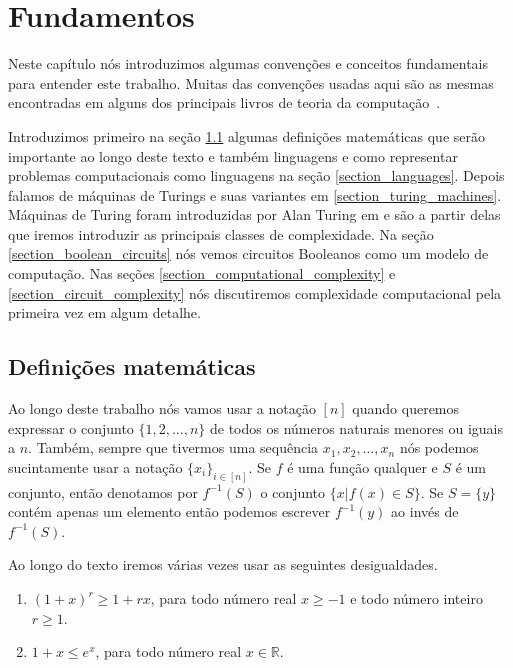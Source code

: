 \chapter{Fundamentos} \label{chapter_fundaments}

Neste capítulo nós introduzimos algumas convenções e conceitos fundamentais para entender este trabalho. Muitas das convenções usadas aqui são as mesmas encontradas em alguns dos principais livros de teoria da computação~\cite{arora2009computational, goldreich2000computational, savage1998models, lewis1997elements, sipser2012introduction}. 

Introduzimos primeiro na seção \ref{section_mathematical_definitions} algumas definições matemáticas que serão importante ao longo deste texto e também linguagens e como representar problemas computacionais como linguagens na seção \ref{section_languages}. Depois falamos de máquinas de Turings e suas variantes em \ref{section_turing_machines}. Máquinas de Turing foram introduzidas por Alan Turing em \cite{turing1936computable} e são a partir delas que iremos introduzir as principais classes de complexidade. Na seção \ref{section_boolean_circuits} nós vemos circuitos Booleanos como um modelo de computação. Nas seções \ref{section_computational_complexity} e \ref{section_circuit_complexity} nós discutiremos complexidade computacional pela primeira vez em algum detalhe.

\section{Definições matemáticas} \label{section_mathematical_definitions}

Ao longo deste trabalho nós vamos usar a notação $[n]$ quando queremos expressar o conjunto $\{1, 2, \dots, n\}$ de todos os números naturais menores ou iguais a $n$. Também, sempre que tivermos uma sequência $x_{1}, x_{2}, \dots, x_{n}$ nós podemos sucintamente usar a notação $\{x_{i}\}_{i \in [n]}$. Se $f$ é uma função qualquer e $S$ é um conjunto, então denotamos por $f^{-1}(S)$ o conjunto $\{ x \lvert f(x) \in S\}$. Se $S = \{y\}$ contém apenas um elemento então podemos escrever $f^{-1}(y)$ ao invés de $f^{-1}(S)$.

Ao longo do texto iremos várias vezes usar as seguintes desigualdades.

\begin{enumerate}

    \item $(1 + x)^{r} \geq 1 + rx$, para todo número real $x \geq -1$ e todo número inteiro $r \geq 1$.
    
    \item $1 + x \leq e^{x}$, para todo número real $x \in \mathbb{R}$.

\end{enumerate}


